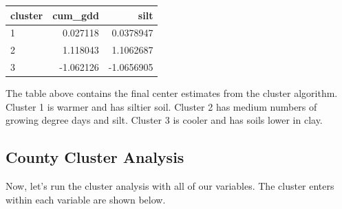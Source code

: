 \documentclass[
]{book}
\newenvironment{Shaded}{\begin{snugshade}}{\end{snugshade}}
\newcommand{\CommentTok}[1]{\textcolor[rgb]{0.56,0.35,0.01}{\textit{#1}}}
\newcommand{\DecValTok}[1]{\textcolor[rgb]{0.00,0.00,0.81}{#1}}
\newcommand{\FunctionTok}[1]{\textcolor[rgb]{0.00,0.00,0.00}{#1}}
\newcommand{\NormalTok}[1]{#1}
\newcommand{\OtherTok}[1]{\textcolor[rgb]{0.56,0.35,0.01}{#1}}
\newcommand{\SpecialCharTok}[1]{\textcolor[rgb]{0.00,0.00,0.00}{#1}}
\newcommand{\StringTok}[1]{\textcolor[rgb]{0.31,0.60,0.02}{#1}}
\begin{document}
\begin{Shaded}
\end{Shaded}

\begin{tabular}[t]{l|r|r}
\hline
cluster & cum\_gdd & silt\\
\hline
1 & 0.027118 & 0.0378947\\
\hline
2 & 1.118043 & 1.1062687\\
\hline
3 & -1.062126 & -1.0656905\\
\hline
\end{tabular}

The table above contains the final center estimates from the cluster algorithm. Cluster 1 is warmer and has siltier soil. Cluster 2 has medium numbers of growing degree days and silt. Cluster 3 is cooler and has soils lower in clay.

\hypertarget{county-cluster-analysis}{%
\subsection{County Cluster Analysis}\label{county-cluster-analysis}}

Now, let's run the cluster analysis with all of our variables. The cluster enters within each variable are shown below.

\begin{Shaded}
\end{Shaded}
\end{document}

